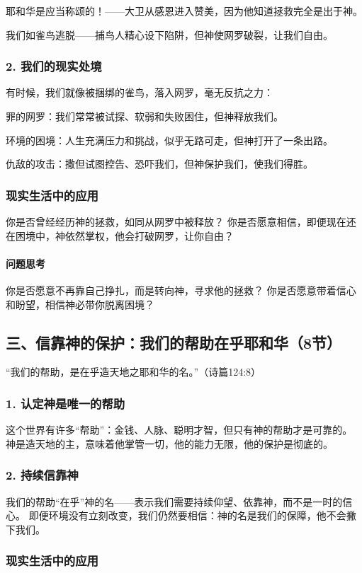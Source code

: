 \documentclass[a4paper, 12pt]{article}
\begin{document}
\hspace{0.6cm}耶和华是应当称颂的！——大卫从感恩进入赞美，因为他知道拯救完全是出于神。

我们如雀鸟逃脱——捕鸟人精心设下陷阱，但神使网罗破裂，让我们自由。
\subsubsection*{2. 我们的现实处境}
有时候，我们就像被捆绑的雀鸟，落入网罗，毫无反抗之力：

罪的网罗：我们常常被试探、软弱和失败困住，但神释放我们。

环境的困境：人生充满压力和挑战，似乎无路可走，但神打开了一条出路。

仇敌的攻击：撒但试图控告、恐吓我们，但神保护我们，使我们得胜。

\subsubsection*{现实生活中的应用}

你是否曾经经历神的拯救，如同从网罗中被释放？
你是否愿意相信，即便现在还在困境中，神依然掌权，他会打破网罗，让你自由？
\paragraph*{问题思考}

你是否愿意不再靠自己挣扎，而是转向神，寻求他的拯救？
你是否愿意带着信心和盼望，相信神必带你脱离困境？
\subsection*{三、信靠神的保护：我们的帮助在乎耶和华（8节）}
“我们的帮助，是在乎造天地之耶和华的名。”（诗篇124:8）

\subsubsection*{1. 认定神是唯一的帮助}
这个世界有许多“帮助”：金钱、人脉、聪明才智，但只有神的帮助才是可靠的。
神是造天地的主，意味着他掌管一切，他的能力无限，他的保护是彻底的。
\subsubsection*{2. 持续信靠神}
我们的帮助“在乎”神的名——表示我们需要持续仰望、依靠神，而不是一时的信心。
即便环境没有立刻改变，我们仍然要相信：神的名是我们的保障，他不会撇下我们。
\subsubsection*{现实生活中的应用}
\end{document}
